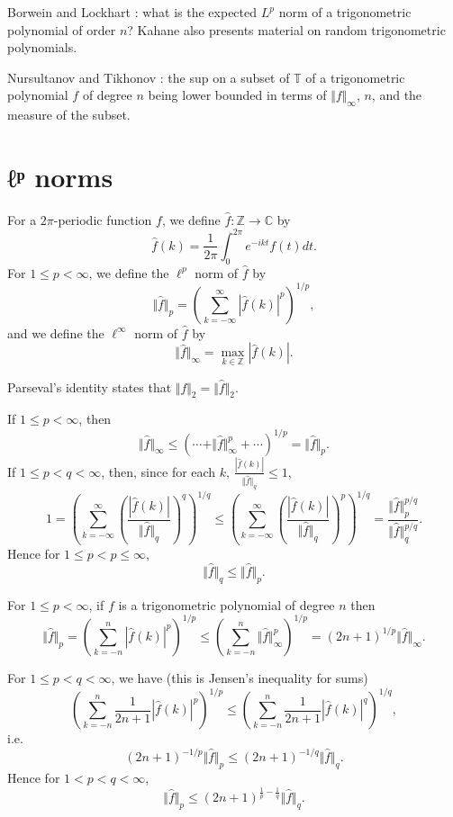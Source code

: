 \documentclass{article}
\newcommand{\norm}[1]{\Vert #1 \Vert}
\theoremstyle{definition}
\begin{document}
Borwein and Lockhart \cite{MR1814174}: what is the expected $L^p$ norm of a trigonometric polynomial of order $n$?
Kahane \cite[Chapter~6]{kahane} also presents material on random trigonometric polynomials. 







Nursultanov and Tikhonov \cite{MR3078275}: the sup on a subset of $\mathbb{T}$ of a trigonometric polynomial $f$ of degree $n$  being lower
bounded in terms of $\norm{f}_\infty$, $n$,  and the measure of the subset. 

\section{ℓᵖ norms}
For a $2\pi$-periodic function $f$, we define $\hat{f}:\mathbb{Z} \to \mathbb{C}$ by
\[
\hat{f}(k)=\frac{1}{2\pi} \int_0^{2\pi} e^{-ikt} f(t) dt.
\]
For $1 \leq p < \infty$, we define the $\ell^p$ norm of $\hat{f}$ by 
\[
\norm{\hat{f}}_p=\left( \sum_{k=-\infty}^\infty |\hat{f}(k)|^p \right)^{1/p},
\]
and we define the $\ell^\infty$ norm of $\hat{f}$ by 
\[
\norm{\hat{f}}_\infty=\max_{k \in \mathbb{Z}} |\hat{f}(k)|.
\]

Parseval's identity \cite[p.~80, Theorem~1.3]{steinI} states that $\norm{f}_2=\norm{\hat{f}}_2$.




If $1 \leq p < \infty$, then
\[
\norm{\hat{f}}_\infty \leq \left( \cdots+\norm{\hat{f}}_\infty^p + \cdots \right)^{1/p}= \norm{\hat{f}}_p.
\]
If $1 \leq p < q < \infty$, then, since for each $k$, $\frac{|\hat{f}(k)|}{\norm{\hat{f}}_q} \leq 1$,
\[
1=\left( \sum_{k=-\infty}^\infty \left( \frac{|\hat{f}(k)|}{\norm{\hat{f}}_q} \right)^q \right)^{1/q} \leq
\left( \sum_{k=-\infty}^\infty \left( \frac{|\hat{f}(k)|}{\norm{\hat{f}}_q} \right)^p \right)^{1/q} 
=\frac{\norm{\hat{f}}_p^{p/q}}{\norm{\hat{f}}_q^{p/q}}.
\]
Hence for $1 \leq p < p \leq \infty$,
\[
\norm{\hat{f}}_q \leq \norm{\hat{f}}_p.
\]

For $1 \leq p < \infty$, if $f$ is a trigonometric polynomial of degree $n$ then 
\[
\norm{\hat{f}}_p 
=\left( \sum_{k=-n}^n |\hat{f}(k)|^p \right)^{1/p} \leq \left( \sum_{k=-n}^n \norm{\hat{f}}_\infty^p \right)^{1/p}
=(2n+1)^{1/p} \norm{\hat{f}}_\infty.
\]

For $1 \leq p < q < \infty$, we have \cite[p.~123, Problem~8.3]{master} (this is  Jensen's inequality for sums)
\[
\left( \sum_{k=-n}^n \frac{1}{2n+1} |\hat{f}(k)|^p \right)^{1/p} \leq \left( \sum_{k=-n}^n \frac{1}{2n+1} |\hat{f}(k)|^q \right)^{1/q},
\]
i.e.
\[
(2n+1)^{-1/p}  \norm{\hat{f}}_p \leq (2n+1)^{-1/q} \norm{\hat{f}}_q.
\]
Hence for $1 < p < q < \infty$,
\[
\norm{\hat{f}}_p \leq (2n+1)^{\frac{1}{p}-\frac{1}{q}} \norm{\hat{f}}_q.
\]
\end{document}

